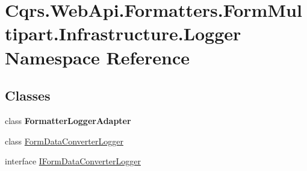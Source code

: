 \hypertarget{namespaceCqrs_1_1WebApi_1_1Formatters_1_1FormMultipart_1_1Infrastructure_1_1Logger}{}\section{Cqrs.\+Web\+Api.\+Formatters.\+Form\+Multipart.\+Infrastructure.\+Logger Namespace Reference}
\label{namespaceCqrs_1_1WebApi_1_1Formatters_1_1FormMultipart_1_1Infrastructure_1_1Logger}
\subsection*{Classes}
\begin{DoxyCompactItemize}
\item 
class {\bfseries Formatter\+Logger\+Adapter}
\item 
class \hyperlink{classCqrs_1_1WebApi_1_1Formatters_1_1FormMultipart_1_1Infrastructure_1_1Logger_1_1FormDataConverterLogger}{Form\+Data\+Converter\+Logger}
\item 
interface \hyperlink{interfaceCqrs_1_1WebApi_1_1Formatters_1_1FormMultipart_1_1Infrastructure_1_1Logger_1_1IFormDataConverterLogger}{I\+Form\+Data\+Converter\+Logger}
\end{DoxyCompactItemize}
